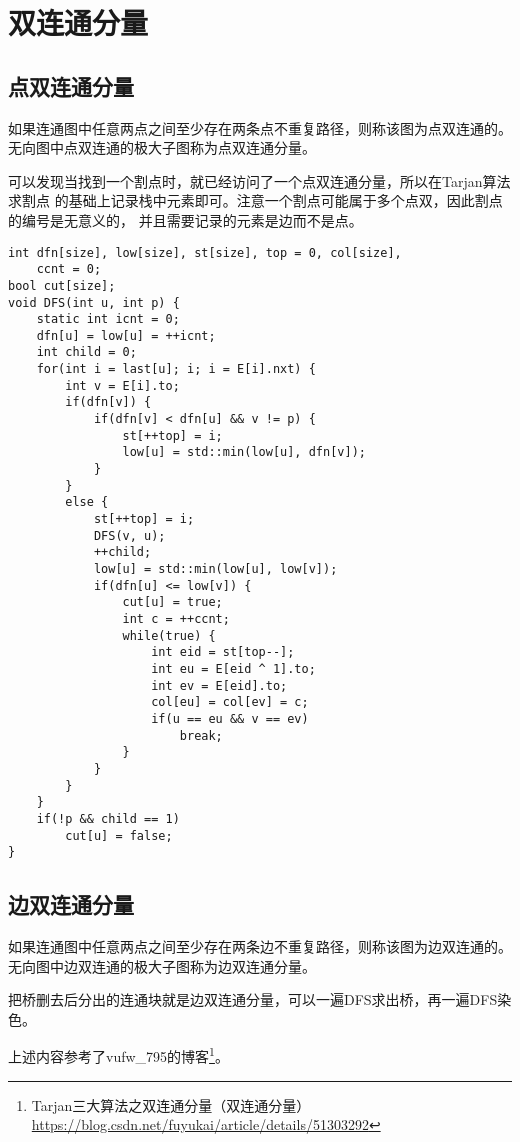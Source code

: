 \section{双连通分量}
\subsection{点双连通分量}
如果连通图中任意两点之间至少存在两条点不重复路径，则称该图为点双连通的。
无向图中点双连通的极大子图称为点双连通分量。

可以发现当找到一个割点时，就已经访问了一个点双连通分量，所以在Tarjan算法求割点
的基础上记录栈中元素即可。注意一个割点可能属于多个点双，因此割点的编号是无意义的，
并且需要记录的元素是边而不是点。

\begin{lstlisting}
int dfn[size], low[size], st[size], top = 0, col[size],
    ccnt = 0;
bool cut[size];
void DFS(int u, int p) {
    static int icnt = 0;
    dfn[u] = low[u] = ++icnt;
    int child = 0;
    for(int i = last[u]; i; i = E[i].nxt) {
        int v = E[i].to;
        if(dfn[v]) {
            if(dfn[v] < dfn[u] && v != p) {
                st[++top] = i;
                low[u] = std::min(low[u], dfn[v]);
            }
        }
        else {
            st[++top] = i;
            DFS(v, u);
            ++child;
            low[u] = std::min(low[u], low[v]);
            if(dfn[u] <= low[v]) {
                cut[u] = true;
                int c = ++ccnt;
                while(true) {
                    int eid = st[top--];
                    int eu = E[eid ^ 1].to;
                    int ev = E[eid].to;
                    col[eu] = col[ev] = c;
                    if(u == eu && v == ev)
                        break;
                }
            }
        }
    }
    if(!p && child == 1)
        cut[u] = false;
}
\end{lstlisting}

\subsection{边双连通分量}
如果连通图中任意两点之间至少存在两条边不重复路径，则称该图为边双连通的。
无向图中边双连通的极大子图称为边双连通分量。

把桥删去后分出的连通块就是边双连通分量，可以一遍DFS求出桥，再一遍DFS染色。

上述内容参考了vufw\_795的博客\footnote{
    Tarjan三大算法之双连通分量（双连通分量）
\url{https://blog.csdn.net/fuyukai/article/details/51303292}
}。
